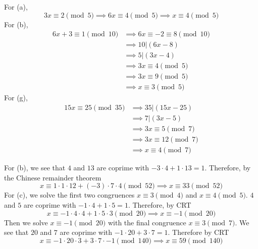  \begin{exercise}[Shifrin 1.3.20.a/b/g]
    For (a), 
    \begin{equation}
      3x \equiv 2 \pmod{5} \implies 6x \equiv 4 \pmod{5} \implies x \equiv 4 \pmod{5} 
    \end{equation}
    For (b), 
    \begin{align}
      6x + 3 \equiv 1 \pmod{10} & \implies 6x \equiv -2 \equiv 8 \pmod{10} \\
                                & \implies 10 | (6x - 8) \\
                                & \implies 5 | (3x - 4) \\
                                & \implies 3x \equiv 4 \pmod{5} \\
                                & \implies 3x \equiv 9 \pmod{5} \\
                                & \implies x \equiv 3 \pmod{5}
    \end{align}
    For (g), 
    \begin{align}
      15x \equiv 25 \pmod{35} & \implies 35 | (15x - 25) \\
                              & \implies 7 | (3x - 5) \\
                              & \implies 3x \equiv 5 \pmod{7} \\
                              & \implies 3x \equiv 12 \pmod{7} \\ 
                              & \implies x \equiv 4 \pmod{7}
    \end{align}
  \end{exercise}

  \begin{exercise}[Shifrin 1.3.21.b/c]
    For (b), we see that $4$ and $13$ are coprime with $-3 \cdot 4 + 1 \cdot 13 = 1$. Therefore, by the Chinese remainder theorem 
    \begin{equation}
      x \equiv 1 \cdot 1 \cdot 12 + (-3) \cdot 7 \cdot 4 \pmod{52} \implies x \equiv 33 \pmod{52}
    \end{equation}
    For (c), we solve the first two congruences $x \equiv 3 \pmod{4}$ and $x \equiv 4 \pmod{5}$. $4$ and $5$ are coprime with $-1 \cdot 4 + 1 \cdot 5 = 1$. Therefore, by CRT 
    \begin{equation}
      x \equiv -1 \cdot 4 \cdot 4 + 1 \cdot 5 \cdot 3 \pmod{20} \implies x \equiv -1 \pmod{20}
    \end{equation}
    Then we solve $x \equiv -1 \pmod{20}$ with the final congruence $x \equiv 3 \pmod{7}$. We see that $20$ and $7$ are coprime with $-1 \cdot 20 + 3 \cdot 7 = 1$. Therefore by CRT 
    \begin{equation}
      x \equiv -1 \cdot 20 \cdot 3 + 3 \cdot 7 \cdot -1 \pmod{140} \implies x \equiv 59 \pmod{140}
    \end{equation}
  \end{exercise}

